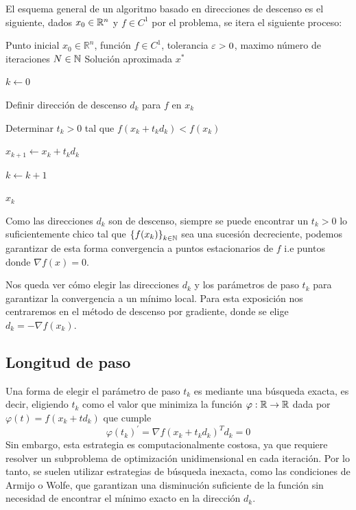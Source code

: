 El esquema general de un algoritmo basado en direcciones de descenso es el siguiente, dados \( x_0 \in \mathbb{R}^n \) y \( f \in C^1 \) por el problema, se itera el siguiente proceso:

\begin{algorithm}
    \caption{Algoritmo General de Descenso}
    \label{alg:descenso_general}
    \begin{algorithmic}[1]
        \Require Punto inicial \( x_0 \in \mathbb{R}^n \), función \( f \in C^1 \), tolerancia \( \varepsilon > 0 \), maximo número de iteraciones \( N \in \mathbb{N} \)
        \Ensure Solución aproximada \( x^* \)

        \State \( k \gets 0 \)

         

        \State Definir dirección de descenso \( d_k \) para \( f \) en \( x_k \) 

        \State Determinar \( t_k > 0 \) tal que \( f(x_k + t_k d_k) < f(x_k) \) 

        \State \( x_{k+1} \gets x_k + t_k d_k \) 

        \State \( k \gets k + 1 \)
        \EndWhile

        \State \Return \( x_k \)
    \end{algorithmic}
\end{algorithm}

Como las direcciones \( d_k \) son de descenso, siempre se puede encontrar un \( t_k > 0 \) lo suficientemente chico tal que
\( {\{f(x_k)\}}_{k \in \mathbb{N}} \) sea una sucesión decreciente, podemos garantizar de esta forma convergencia a puntos estacionarios de \( f \) i.e puntos donde \( \nabla f(x) = 0 \).

Nos queda ver cómo elegir las direcciones \( d_k \) y los parámetros de paso \( t_k \) para garantizar la convergencia a un mínimo local. Para esta exposición nos centraremos en el método de descenso por gradiente, donde se elige \( d_k = -\nabla f(x_k) \).

\subsection{Longitud de paso}

Una forma de elegir el parámetro de paso \( t_k \) es mediante una búsqueda exacta, es decir, eligiendo \( t_k \) como el valor que minimiza la función
\( \varphi: \mathbb{R} \to \mathbb{R} \) dada por \( \varphi(t) = f(x_k + t d_k) \) que cumple \[
    {\varphi(t_k)}^\prime = {\nabla f(x_k + t_k d_k)}^T d_k = 0
\]
Sin embargo, esta estrategia es computacionalmente costosa, ya que requiere resolver un subproblema de optimización unidimensional en cada iteración. Por lo tanto, se suelen utilizar estrategias de búsqueda inexacta, como las condiciones de Armijo o Wolfe, que garantizan una disminución suficiente de la función sin necesidad de encontrar el mínimo exacto en la dirección \( d_k \).


